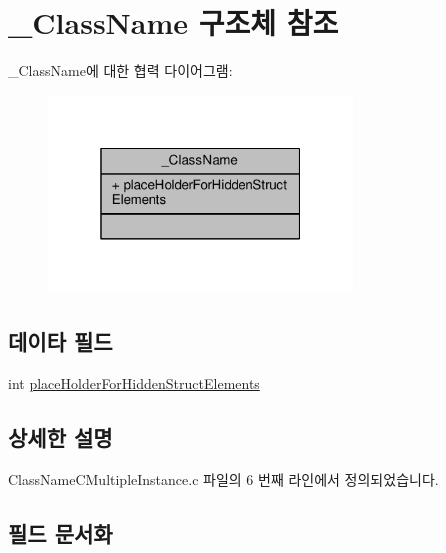 \hypertarget{struct___class_name}{}\section{\+\_\+\+Class\+Name 구조체 참조}
\label{struct___class_name}


\+\_\+\+Class\+Name에 대한 협력 다이어그램\+:
\nopagebreak
\begin{figure}[H]
\begin{center}
\leavevmode
\includegraphics[width=229pt]{struct___class_name__coll__graph}
\end{center}
\end{figure}
\subsection*{데이타 필드}
\begin{DoxyCompactItemize}
\item 
int \hyperlink{struct___class_name_a5705d42d83aa1408a1f19b218cd11502}{place\+Holder\+For\+Hidden\+Struct\+Elements}
\end{DoxyCompactItemize}


\subsection{상세한 설명}


Class\+Name\+C\+Multiple\+Instance.\+c 파일의 6 번째 라인에서 정의되었습니다.



\subsection{필드 문서화}
